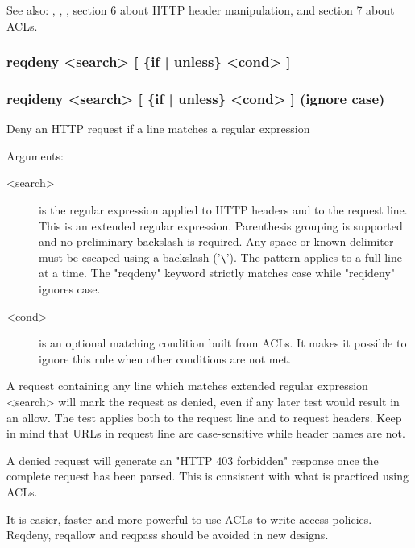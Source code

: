   See also: , , , section 6 about HTTP header
            manipulation, and section 7 about ACLs.

\subsubsection[reqdeny]{reqdeny  <search> [ \{if | unless\} <cond> ]}
\subsubsection[reqideny]{reqideny <search> [ \{if | unless\} <cond> ]  (ignore case)}


  Deny an HTTP request if a line matches a regular expression


  Arguments:
\begin{description}
\item[<search>]  is the regular expression applied to HTTP headers and to the
              request line. This is an extended regular expression. Parenthesis
              grouping is supported and no preliminary backslash is required.
              Any space or known delimiter must be escaped using a backslash
              ('\verb|\|'). The pattern applies to a full line at a time. The
              "reqdeny" keyword strictly matches case while "reqideny" ignores
              case.

\item[<cond>] is an optional matching condition built from ACLs. It makes it
              possible to ignore this rule when other conditions are not met.
\end{description}

  A request containing any line which matches extended regular expression
  <search> will mark the request as denied, even if any later test would
  result in an allow. The test applies both to the request line and to request
  headers. Keep in mind that URLs in request line are case-sensitive while
  header names are not.

  A denied request will generate an "HTTP 403 forbidden" response once the
  complete request has been parsed. This is consistent with what is practiced
  using ACLs.

  It is easier, faster and more powerful to use ACLs to write access policies.
  Reqdeny, reqallow and reqpass should be avoided in new designs.

